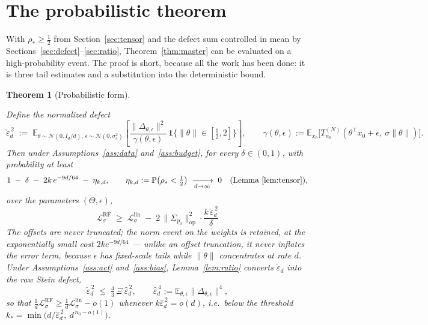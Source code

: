 \documentclass[11pt]{article}
\newtheorem{theorem}{Theorem}
\theoremstyle{remark}
\newcommand{\E}{\mathbb{E}}
\newcommand{\Sig}{\Sigma_{p_0}}
\newcommand{\op}[1]{\lVert #1 \rVert_{\mathrm{op}}}
\begin{document}
\section{The probabilistic theorem}\label{sec:prob}

With $\rho_* \ge \tfrac12$ from Section~\ref{sec:tensor} and the defect sum controlled in mean by Sections~\ref{sec:defect}--\ref{sec:ratio}, Theorem~\ref{thm:master} can be evaluated on a high-probability event. The proof is short, because all the work has been done: it is three tail estimates and a substitution into the deterministic bound.

\begin{theorem}[Probabilistic form]\label{thm:prob}

\noindent Define the \emph{normalized defect}
\[
\check\varepsilon_d^{\,2} \;:=\; \E_{\theta \sim \mathcal N(0,I_d/d),\ \epsilon\sim\mathcal N(0,\sigma_\epsilon^2)}\left[\frac{\lVert\Delta_{\theta,\epsilon}\rVert^2}{\gamma(\theta,\epsilon)}\,\mathbf 1\big\{\lVert\theta\rVert\in[\tfrac12,2]\big\}\right],
\qquad \gamma(\theta,\epsilon) := \E_{x_0}\big[T^{(N)}_{n_0}(\theta^\top x_0 + \epsilon,\ \sigma\lVert\theta\rVert)\big].
\]
Then under Assumptions~\ref{ass:data} and~\ref{ass:budget}, for every $\delta \in (0,1)$, with probability at least
\[
1 \;-\; \delta \;-\; 2k\,e^{-9d/64} \;-\; \eta_{k,d}, \qquad \eta_{k,d} := \mathbb P\big(\rho_* < \tfrac12\big) \;\xrightarrow[d\to\infty]{}\; 0
\quad\text{(Lemma~\ref{lem:tensor})},
\]
over the parameters $(\Theta,\epsilon)$,
\[
\boxed{\ \ \mathcal L^{\mathrm{RF}}_\sigma \;\ge\; \mathcal L^{\mathrm{lin}}_\sigma \;-\; 2\,\op{\Sig}^{2}\cdot\frac{k\,\check\varepsilon_d^{\,2}}{\delta}\ \ }
\]
The offsets are never truncated; the norm event on the weights is retained, at the exponentially small cost $2ke^{-9d/64}$ --- unlike an offset truncation, it never inflates the error term, because $\epsilon$ has fixed-scale tails while $\lVert\theta\rVert$ concentrates at rate $d$. Under Assumptions~\ref{ass:act} and~\ref{ass:bias}, Lemma~\ref{lem:ratio} converts $\check\varepsilon_d$ into the raw Stein defect,
\[
\check\varepsilon_d^{\,2} \;\le\; \tfrac43\,\Xi\ \hat\varepsilon_d^{\,2},
\qquad \hat\varepsilon_d^{\,4} := \E_{\theta,\epsilon}\big\lVert\Delta_{\theta,\epsilon}\big\rVert^4 ,
\]
so that $\tfrac1d\mathcal L^{\mathrm{RF}}_\sigma \ge \tfrac1d\mathcal L^{\mathrm{lin}}_\sigma - o(1)$ whenever $k\hat\varepsilon_d^{\,2} = o(d)$, i.e.\ below the threshold $k_* = \min\big(d/\hat\varepsilon_d^{\,2},\ d^{\,n_0 - o(1)}\big)$.


\end{theorem}
\end{document}
